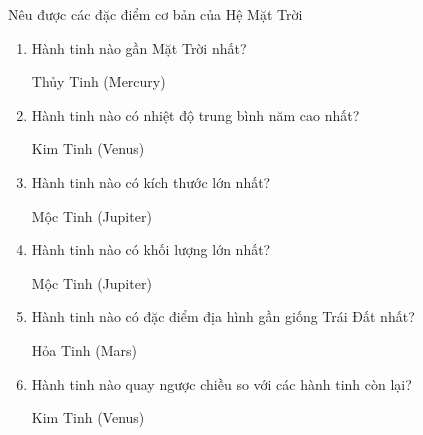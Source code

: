 \begin{dang}{Nêu được các đặc điểm cơ bản của Hệ Mặt Trời}
{		\begin{enumerate}[label=\alph*)]
			\item Hành tinh nào gần Mặt Trời nhất?
			
			Thủy Tinh (Mercury)
			\item Hành tinh nào có nhiệt độ trung bình năm cao nhất?
			
			Kim Tinh (Venus)
			
			\item Hành tinh nào có kích thước lớn nhất?
			
			Mộc Tinh (Jupiter)
			\item Hành tinh nào có khối lượng lớn nhất?
			
			Mộc Tinh (Jupiter)
			
			\item Hành tinh nào có đặc điểm địa hình gần giống Trái Đất nhất?
			
			Hỏa Tinh (Mars)
			
			\item Hành tinh nào quay ngược chiều so với các hành tinh còn lại?
			
			Kim Tinh (Venus)	
		\end{enumerate}
		
	}
\end{dang}
